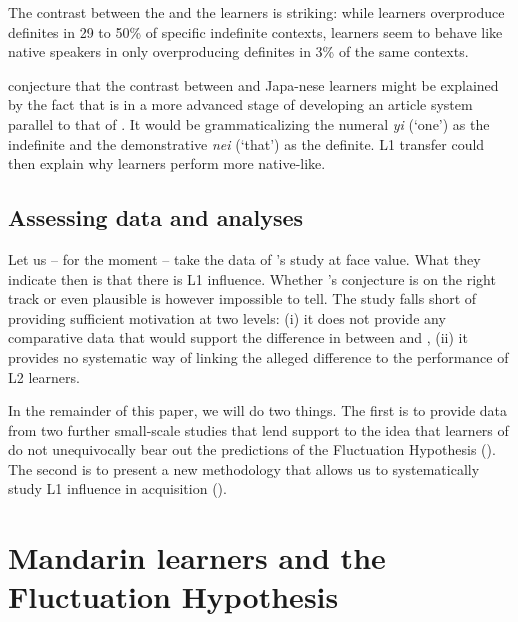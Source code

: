 \documentclass[output=paper,
modfonts
]{langscibook}
\begin{document}
The contrast between the  and the  learners is striking: while  learners overproduce definites in 29 to 50\% of specific indefinite contexts,  learners seem to behave like native speakers in only overproducing definites in 3\% of the same contexts.

\citet{SnapeLeungTing2006} conjecture that the contrast between  and Japa\hyp{}nese learners might be explained by the fact that  is in a more advanced stage of developing an article system parallel to that of . It would be grammaticalizing the numeral \textit{yi} (‘one’) as the indefinite and the demonstrative \textit{nei} (‘that’) as the definite. L1 transfer could then explain why  learners perform more native-like.

\subsection{Assessing data and analyses}

Let us -- for the moment -- take the data of \citeauthor{Ting2005}’s study at face value. What they indicate then is that there is L1 influence. Whether \citeauthor{SnapeLeungTing2006}’s conjecture is on the right track or even plausible is however impossible to tell. The study falls short of providing sufficient motivation at two levels: (i) it does not provide any comparative data that would support the difference in  between  and , (ii) it provides no systematic way of linking the alleged difference to the performance of L2 learners.

In the remainder of this paper, we will do two things. The first is to provide data from two further small-scale studies that lend support to the idea that  learners of  do not unequivocally bear out the predictions of the Fluctuation Hypothesis (). The second is to present a new methodology that allows us to systematically study L1 influence in acquisition ().

\section{Mandarin learners and the Fluctuation Hypothesis}
\label{sec:lebruyn:4}
\end{document}
